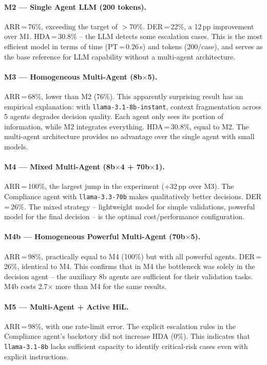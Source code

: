 \documentclass[preprint,12pt,authoryear]{elsarticle}
\begin{document}
\paragraph{M2 --- Single Agent LLM (200 tokens).}
ARR\,=\,76\%, exceeding the target of $>$70\%.
DER\,=\,22\%, a 12\,pp improvement over M1.
HDA\,=\,30.8\% -- the LLM detects some escalation cases.
This is the most efficient model in terms of time (PT\,=\,0.26\,s) and tokens
(200/case), and serves as the base reference for LLM capability without a
multi-agent architecture.

\paragraph{M3 --- Homogeneous Multi-Agent (8b$\times$5).}
ARR\,=\,68\%, lower than M2 (76\%).
This apparently surprising result has an empirical explanation: with
\texttt{llama-3.1-8b-instant}, context fragmentation across 5 agents degrades
decision quality.
Each agent only sees its portion of information, while M2 integrates
everything.
HDA\,=\,30.8\%, equal to M2.
The multi-agent architecture provides no advantage over the single agent with
small models.

\paragraph{M4 --- Mixed Multi-Agent (8b$\times$4 + 70b$\times$1).}
ARR\,=\,100\%, the largest jump in the experiment (+32\,pp over M3).
The Compliance agent with \texttt{llama-3.3-70b} makes qualitatively better
decisions.
DER\,=\,26\%.
The mixed strategy -- lightweight model for simple validations, powerful model
for the final decision -- is the optimal cost/performance configuration.

\paragraph{M4b --- Homogeneous Powerful Multi-Agent (70b$\times$5).}
ARR\,=\,98\%, practically equal to M4 (100\%) but with all powerful agents.
DER\,=\,26\%, identical to M4.
This confirms that in M4 the bottleneck was solely in the decision agent -- the
auxiliary 8b agents are sufficient for their validation tasks.
M4b costs 2.7$\times$ more than M4 for the same results.

\paragraph{M5 --- Multi-Agent + Active HiL.}
ARR\,=\,98\%, with one rate-limit error.
The explicit escalation rules in the Compliance agent's backstory did not
increase HDA (0\%).
This indicates that \texttt{llama-3.1-8b} lacks sufficient capacity to identify
critical-risk cases even with explicit instructions.
\end{document}
